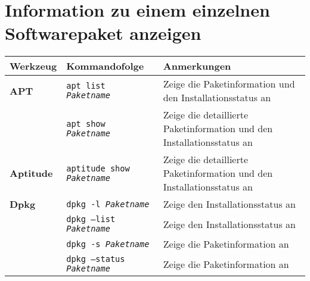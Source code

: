 \documentclass[10pt,a4paper]{article}
\begin{document}
\section{Information zu einem einzelnen Softwarepaket anzeigen}
\begin{tabular}{ p{3.5cm} p{9.6cm} p{11cm}}
  \hline
  \rowcolor{Gray}
  \textbf{Werkzeug} & \textbf{Kommandofolge} & \textbf{Anmerkungen} \\
  \hline 
  \textbf{APT} & \texttt{apt list \textit{Paketname}} & Zeige die Paketinformation und den Installationsstatus an \\
  \rowcolor{Gray}
  & \texttt{apt show \textit{Paketname}} & Zeige die detaillierte Paketinformation und den Installationsstatus an \\
  \textbf{Aptitude} & \texttt{aptitude show \textit{Paketname}} & Zeige die detaillierte Paketinformation und den Installationsstatus an \\
  \textbf{Dpkg} & \texttt{dpkg -l \textit{Paketname} } & Zeige den Installationsstatus an \\
  \rowcolor{Gray}
  & \texttt{dpkg --list \textit{Paketname} } & Zeige den Installationsstatus an\\
  & \texttt{dpkg -s \textit{Paketname} } & Zeige die Paketinformation an\\
  \rowcolor{Gray}
  & \texttt{dpkg --status \textit{Paketname} } & Zeige die Paketinformation an\\
  \hline
\end{tabular}


\newpage

\cheatsheet
\end{document}
